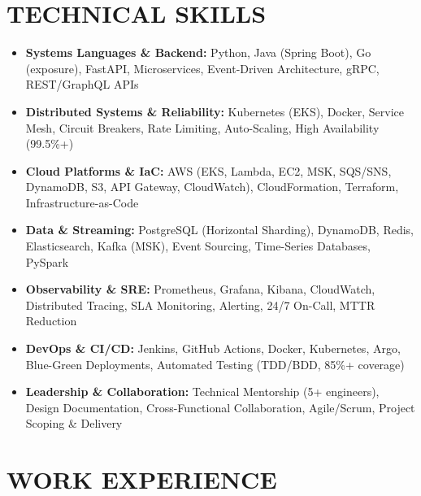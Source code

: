 \documentclass[letterpaper,10pt]{article}
\newcommand{\resumeItem}[1]{\item\small #1}
\begin{document}
\section{\textcolor{metablue}{TECHNICAL SKILLS}}
\vspace{-5pt}
\small
\begin{itemize}
\resumeItem{\textbf{Systems Languages \& Backend:} Python, Java (Spring Boot), Go (exposure), FastAPI, Microservices, Event-Driven Architecture, gRPC, REST/GraphQL APIs}
\resumeItem{\textbf{Distributed Systems \& Reliability:} Kubernetes (EKS), Docker, Service Mesh, Circuit Breakers, Rate Limiting, Auto-Scaling, High Availability (99.5\%+)}
\resumeItem{\textbf{Cloud Platforms \& IaC:} AWS (EKS, Lambda, EC2, MSK, SQS/SNS, DynamoDB, S3, API Gateway, CloudWatch), CloudFormation, Terraform, Infrastructure-as-Code}
\resumeItem{\textbf{Data \& Streaming:} PostgreSQL (Horizontal Sharding), DynamoDB, Redis, Elasticsearch, Kafka (MSK), Event Sourcing, Time-Series Databases, PySpark}
\resumeItem{\textbf{Observability \& SRE:} Prometheus, Grafana, Kibana, CloudWatch, Distributed Tracing, SLA Monitoring, Alerting, 24/7 On-Call, MTTR Reduction}
\resumeItem{\textbf{DevOps \& CI/CD:} Jenkins, GitHub Actions, Docker, Kubernetes, Argo, Blue-Green Deployments, Automated Testing (TDD/BDD, 85\%+ coverage)}
\resumeItem{\textbf{Leadership \& Collaboration:} Technical Mentorship (5+ engineers), Design Documentation, Cross-Functional Collaboration, Agile/Scrum, Project Scoping \& Delivery}
\end{itemize}
\vspace{-10pt}


\section{\textcolor{metablue}{WORK EXPERIENCE}}
\vspace{-12pt}
\end{document}
